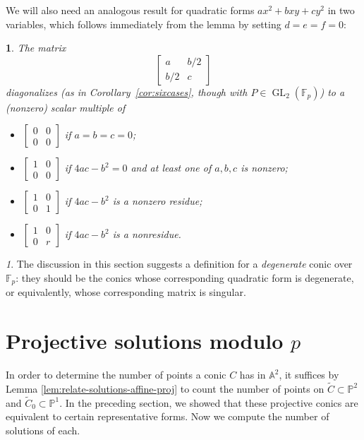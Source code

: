 \documentclass[10pt,a4paper]{amsart}
\numberwithin{equation}{section}
\numberwithin{figure}{section}
\numberwithin{table}{section}
\theoremstyle{definition}
\theoremstyle{plain}
\theoremstyle{remark}
\newtheorem*{rem*}{\protect\remarkname}
\theoremstyle{plain}
\newtheorem{cor}[thm]{\protect\corollaryname}
\theoremstyle{definition}
\theoremstyle{plain}
\theoremstyle{plain}
\providecommand{\remarkname}{Remark}
\providecommand{\corollaryname}{Corollary}
\newcommand{\A}{\mathbb{A}}
\renewcommand{\P}{\mathbb{P}}
\newcommand{\F}{\mathbb{F}}
\newcommand{\GL}{\operatorname{GL}}
\begin{document}
	We will also need an analogous result for quadratic forms $ax^2+bxy+cy^2$ in two variables, which follows immediately from the lemma by setting $d=e=f=0$:
	\begin{cor}\label{cor:diag-P1}
	The matrix
	\begin{equation*}
	\begin{bmatrix}a&b/2\\b/2&c\end{bmatrix}
	\end{equation*}
	diagonalizes (as in Corollary~\ref{cor:sixcases}, though with $P \in \GL_2(\F_p)$) to a (nonzero) scalar multiple of
		\begin{itemize}
			\item $\left[\begin{smallmatrix}0&0\\0&0\end{smallmatrix}\right]$ if $a=b=c=0$;
			\item $\left[\begin{smallmatrix}1&0\\0&0\end{smallmatrix}\right]$ if $4ac-b^2=0$ and at least one of $a,b,c$ is nonzero;
			\item $\left[\begin{smallmatrix}1&0\\0&1\end{smallmatrix}\right]$ if $4ac-b^2$ is a nonzero residue;
			\item $\left[\begin{smallmatrix}1&0\\0&r\end{smallmatrix}\right]$ if $4ac-b^2$ is a nonresidue.
		\end{itemize}
	\end{cor}
	
	\begin{rem*}
		The discussion in this section suggests a definition for a \emph{degenerate} conic over $\F_p$: they should be the conics whose corresponding quadratic form is degenerate, or equivalently, whose corresponding matrix is singular.
	\end{rem*}
	
	\section{Projective solutions modulo $p$}
	\label{sec:proj-solutions}
	
	In order to determine the number of points a conic $C$ has in $\A^2$, it suffices by Lemma \ref{lem:relate-solutions-affine-proj} to count the number of points on $\widetilde{C}\subset \P^2$ and $\widetilde{C}_0\subset \P^1$. In the preceding section, we showed that these projective conics are equivalent to certain representative forms. Now we compute the number of solutions of each.
	
\end{document}
